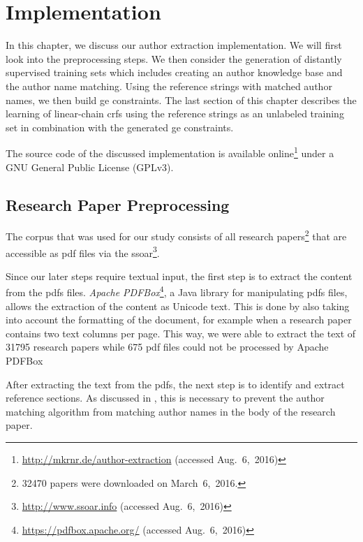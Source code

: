 \chapter{Implementation}\label{cha:implementation}

In this chapter, we discuss our author extraction implementation.
We will first look into the preprocessing steps.
We then consider the generation of distantly supervised training sets which includes creating an author knowledge base and the author name matching.
Using the reference strings with matched author names, we then build \gls{ge} constraints.
The last section of this chapter describes the learning of \glspl{linear-chain crf} using the reference strings as an unlabeled training set in combination with the generated \gls{ge} constraints.

The source code of the discussed implementation is available online\footnote{\url{http://mkrnr.de/author-extraction} (accessed Aug.~6,~2016)} under a GNU General Public License (GPLv3).

\section{Research Paper Preprocessing}\label{sec:i-preprocessing}

The corpus that was used for our study consists of all research papers\footnote{\num{32470} papers were downloaded on March~6,~2016.} that are accessible as \gls{pdf} files via the \gls{ssoar}\footnote{\url{http://www.ssoar.info} (accessed Aug.~6,~2016)}.

Since our later steps require textual input, the first step is to extract the content from the \glspl{pdf} files.
\textit{Apache PDFBox}\footnote{\url{https://pdfbox.apache.org/} (accessed Aug.~6,~2016)}, a Java library for manipulating \glspl{pdf} files, allows the extraction of the content as Unicode text.
This is done by also taking into account the formatting of the document, for example when a research paper contains two text columns per page.
This way, we were able to extract the text of \num{31795} research papers while \num{675} \gls{pdf} files could not be processed by Apache PDFBox

\bigskip

After extracting the text from the \glspl{pdf}, the next step is to identify and extract reference sections.
As discussed in , this is necessary to prevent the author matching algorithm from matching author names in the body of the research paper.


